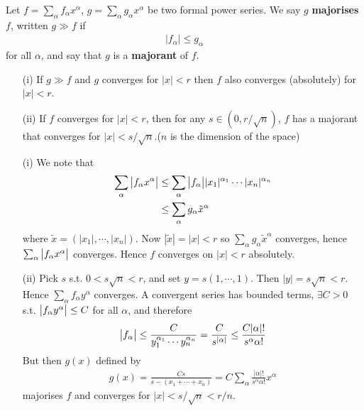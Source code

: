 \documentclass[10pt,a4paper]{report}
\newenvironment{proof}
{\begin{changemargin}{1cm}{0.5cm} 
	}%
	{\end{changemargin}
}
\begin{document}
 Let $f = \sum_{\alpha} f_{\alpha} x^{\alpha}$, $g= \sum_{\alpha} g_{\alpha} x^{\alpha}$ be two formal power series. We say $g$ \textbf{majorises} $f$, written $g \gg f$ if
\begin{align*}
\big|f_{\alpha} \big| \leq g_{\alpha}
\end{align*}
for all $\alpha$, and say that $g$ is a \textbf{majorant} of $f$.
\s

\lem \begin{itemize}
\item[(i)] If $g\gg f$ and $g$ converges for $|x|<r$ then $f$ also converges (absolutely) for $|x| <r$.
\item[(ii)] If $f$ converges for $|x|<r$, then for any $s\in (0,r/\sqrt{n})$, $f$ has a majorant that converges for $|x|<s/\sqrt{n}$.($n$ is the dimension of the space)
\end{itemize}
\begin{proof}
\pf \begin{itemize}
\item[(i)] We note that
\begin{align*}
\sum_{\alpha} \big| f_{\alpha} x^{\alpha} \big| &\leq \sum_{\alpha} \big| f_{\alpha} \big| |x_1|^{\alpha_1} \cdots |x_n|^{\alpha_n} \\
&\leq \sum_{\alpha} g_{\alpha} \tilde{x}^{\alpha}
\end{align*}
where $\tilde{x} = (|x_1|,\cdots,|x_n|)$. Now $|\tilde{x}| = |x|  <r$ so $\sum_{\alpha} g_{\alpha} \tilde{x}^{\alpha}$ converges, hence $\sum_{\alpha} \big| f_{\alpha} x^{\alpha} \big|$ converges. Hence $f$ converges on $|x|<r$ absolutely. 
\item[(ii)] Pick $s$ s.t. $0<s\sqrt{n} <r$, and set $y=s(1,\cdots,1)$. Then $|y| = s\sqrt{n} <r$. Hence $\sum_{\alpha}f_{\alpha}y^{\alpha}$ converges. A convergent series has bounded terms, $\exists C>0$ s.t. $\big| f_{\alpha}y^{\alpha} \big| \leq C$ for all $\alpha$, and therefore
\begin{align*}
\big| f_{\alpha} \big| \leq \frac{C}{y_1^{\alpha_1} \cdots y_n^{\alpha_n}} = \frac{C}{s^{|\alpha|}} \leq \frac{C |\alpha|!}{s^{\alpha} \alpha!}
\end{align*}
But then $g(x)$ defined by
\begin{align*}
g(x) = \frac{Cs}{s-(x_1 + \cdots + x_n)}  = C \sum_{\alpha} \frac{|\alpha|!}{s^{\alpha}\alpha!}x^{\alpha}
\end{align*}
majorises $f$ and converges for $|x|<s/\sqrt{n}<r/n$.
\end{itemize}

\eop
\end{proof}
\s
\end{document}
